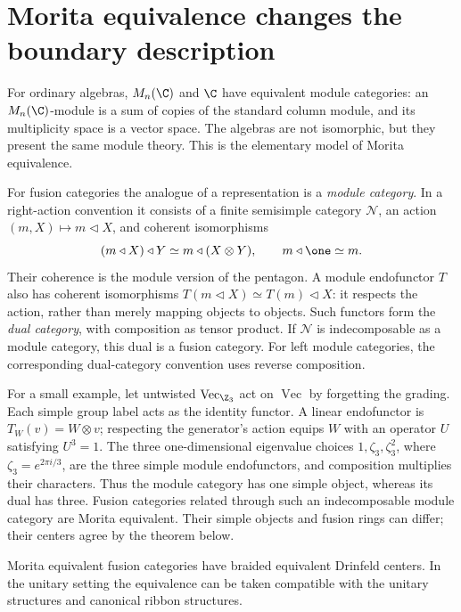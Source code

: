 \section{Morita equivalence changes the boundary description}

For ordinary algebras, $M_n(\C)$ and $\C$ have equivalent module
categories: an $M_n(\C)$-module is a sum of copies of the standard
column module, and its multiplicity space is a vector space.  The
algebras are not isomorphic, but they present the same module theory.
This is the elementary model of Morita equivalence.

For fusion categories the analogue of a representation is a
\emph{module category}. In a right-action convention it consists
of a finite semisimple category $\mathcal N$, an action
$(m,X)\mapsto m\triangleleft X$, and coherent isomorphisms
\[
 (m\triangleleft X)\triangleleft Y
   \simeq m\triangleleft(X\otimes Y),\qquad
 m\triangleleft\one\simeq m.
\]
Their coherence is the module version of the pentagon. A module
endofunctor $T$ also has coherent isomorphisms
$T(m\triangleleft X)\simeq T(m)\triangleleft X$:
it respects the action, rather than merely mapping objects to objects.
Such functors form the \emph{dual category}, with composition as
tensor product. If $\mathcal N$ is indecomposable as a module
category, this dual is a fusion category. For left module categories,
the corresponding dual-category convention uses reverse composition.

For a small example, let untwisted $\operatorname{Vec}_{\Z_3}$
act on $\operatorname{Vec}$ by forgetting the grading. Each simple
group label acts as the identity functor. A linear endofunctor is
$T_W(v)=W\otimes v$; respecting the generator's action equips
$W$ with an operator $U$ satisfying $U^3=1$. The three one-dimensional
eigenvalue choices $1,\zeta_3,\zeta_3^2$, where
$\zeta_3=e^{2\pi i/3}$, are the three simple module
endofunctors, and composition multiplies their characters. Thus the
module category has one simple object, whereas its dual has three.
Fusion categories related through such an indecomposable module
category are Morita equivalent. Their simple objects and fusion
rings can differ; their centers agree by the theorem below.

\begin{theorem}
Morita equivalent fusion categories have braided equivalent
Drinfeld centers.  In the unitary setting the equivalence can be
taken compatible with the unitary structures and canonical ribbon
structures.
\end{theorem}

